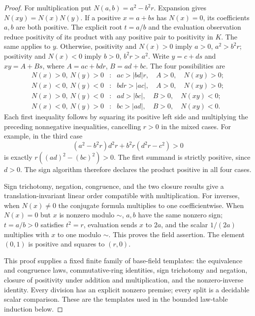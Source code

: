 \begin{proof}
For multiplication put $N(a,b)=a^2-b^2r$. Expansion gives
$N(xy)=N(x)N(y)$. If a positive $x=a+bs$ has $N(x)=0$, its
coefficients $a,b$ are both positive. The explicit root $t=a/b$
and the evaluation observation reduce positivity of its product
with any positive pair to positivity in $K$. The same applies to $y$.
Otherwise, positivity and $N(x)>0$ imply $a>0$, $a^2>b^2r$;
positivity and $N(x)<0$ imply $b>0$, $b^2r>a^2$.
Write $y=c+ds$ and $xy=A+Bs$, where
$A=ac+bdr$, $B=ad+bc$. The four possibilities are
\[
\begin{array}{ccl}
 N(x)>0,\ N(y)>0 &: & ac>|bd|r,\quad A>0,\quad N(xy)>0;\\
 N(x)<0,\ N(y)<0 &: & bdr>|ac|,\quad A>0,\quad N(xy)>0;\\
 N(x)>0,\ N(y)<0 &: & ad>|bc|,\quad B>0,\quad N(xy)<0;\\
 N(x)<0,\ N(y)>0 &: & bc>|ad|,\quad B>0,\quad N(xy)<0.
\end{array}
\]
Each first inequality follows by squaring its positive left side
and multiplying the preceding nonnegative inequalities, cancelling
$r>0$ in the mixed cases. For example, in the third case
\[
 (a^2-b^2r)d^2r+b^2r(d^2r-c^2)>0
\]
is exactly $r((ad)^2-(bc)^2)>0$. The first summand is strictly
positive, since $d>0$. The sign algorithm therefore declares the
product positive in all four cases.

Sign trichotomy, negation, congruence, and the two closure results
give a translation-invariant linear order compatible with
multiplication. For inverses, when $N(x)\ne0$ the conjugate formula
multiplies to one coefficientwise. When $N(x)=0$ but $x$ is nonzero
modulo $\sim$, $a,b$ have the same nonzero sign; $t=a/b>0$ satisfies
$t^2=r$, evaluation sends $x$ to $2a$, and the scalar $1/(2a)$
multiplies with $x$ to one modulo $\sim$. This proves the field
assertion. The element $(0,1)$ is positive and squares to $(r,0)$.

This proof supplies a fixed finite family of base-field templates:
the equivalence and congruence laws, commutative-ring identities,
sign trichotomy and negation, closure of positivity under addition
and multiplication, and the nonzero-inverse identity. Every division
has an explicit nonzero premise; every split is a decidable scalar
comparison. These are the templates used in the bounded law-table
induction below.
\end{proof}

